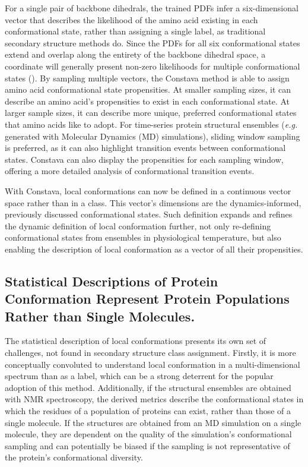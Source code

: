 For a single pair of backbone dihedrals, the trained PDFs infer a six-dimensional vector that describes the likelihood of the amino acid existing in each conformational state, rather than assigning a single label, as traditional secondary structure methods do. Since the PDFs for all six conformational states extend and overlap along the entirety of the backbone dihedral space, a coordinate will generally present non-zero likelihoods for multiple conformational states (). By sampling multiple vectors, the Constava method is able to assign amino acid conformational state propensities. At smaller sampling sizes, it can describe an amino acid's propensities to exist in each conformational state. At larger sample sizes, it can describe more unique, preferred conformational states that amino acids like to adopt. For time-series protein structural ensembles (\textit{e.g.} generated with Molecular Dynamics (MD) simulations), sliding window sampling is preferred, as it can also highlight transition events between conformational states. Constava can also display the propensities for each sampling window, offering a more detailed analysis of conformational transition events. 

With Constava, local conformations can now be defined in a continuous vector space rather than in a class. This vector's dimensions are the \gls{dynamics}-informed, previously discussed conformational states.
Such definition expands and refines the dynamic definition of local conformation further, not only re-defining conformational states from ensembles in physiological temperature, but also enabling the description of local conformation as a vector of all their propensities. 


\subsection{Statistical Descriptions of Protein Conformation Represent Protein Populations Rather than Single Molecules.}

The statistical description of local conformations presents its own set of challenges, not found in secondary structure class assignment. Firstly, it is more conceptually convoluted to understand local conformation in a multi-dimensional spectrum than as a label, which can be a strong deterrent for the popular adoption of this method. Additionally, if the structural ensembles are obtained with NMR spectroscopy, the derived metrics describe the conformational states in which the residues of a population of proteins can exist, rather than those of a single molecule. 
If the structures are obtained from an MD simulation on a single molecule, they are dependent on the quality of the simulation's conformational sampling and can potentially be biased if the sampling is not representative of the protein's conformational diversity.


